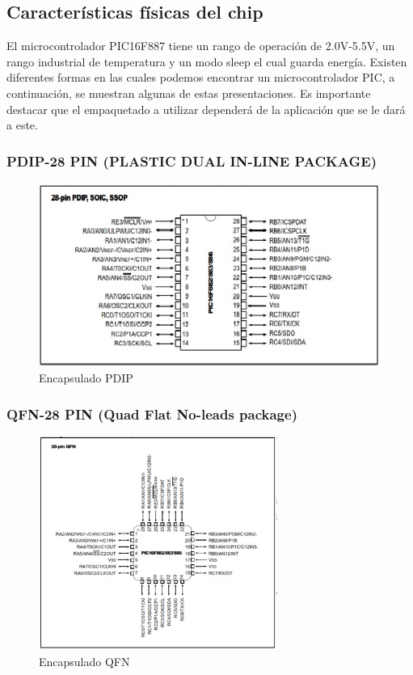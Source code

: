 \documentclass[12pt,a4paper]{article}
\begin{document}
   \subsection{Características físicas del chip}
   El microcontrolador PIC16F887 tiene un rango de operación de 2.0V-5.5V, un rango industrial de temperatura y un modo sleep el cual guarda energía. Existen diferentes formas en las cuales podemos encontrar un microcontrolador PIC, a continuación, se muestran algunas de estas presentaciones. Es importante destacar que el empaquetado a utilizar dependerá de la aplicación que se le dará a este.
   
   \subsubsection{PDIP-28 PIN (PLASTIC DUAL IN-LINE PACKAGE)}
   \begin{figure}[htpb]
   \centering
   \includegraphics[height=6cm]{PDIP}
   \caption{Encapsulado PDIP}
   \label{fig:PDIP}
   \end{figure}
   
   \subsubsection{QFN-28 PIN (Quad Flat No-leads package)}
   \begin{figure}[htpb]
   \centering
   \includegraphics[height=7cm]{QFN}
   \caption{Encapsulado QFN}
   \label{fig:QFN}
   \end{figure}
   
\end{document}

